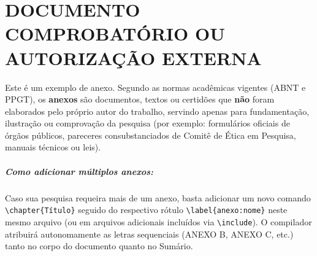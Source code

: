 \anexos

%

\chapter{DOCUMENTO COMPROBATÓRIO OU AUTORIZAÇÃO EXTERNA}
\label{anexo:autorizacao}

Este é um exemplo de anexo. Segundo as normas acadêmicas vigentes (ABNT e PPGT), os \textbf{anexos} são documentos, textos ou certidões que \textbf{não} foram elaborados pelo próprio autor do trabalho, servindo apenas para fundamentação, ilustração ou comprovação da pesquisa (por exemplo: formulários oficiais de órgãos públicos, pareceres consubstanciados de Comitê de Ética em Pesquisa, manuais técnicos ou leis).

\paragraph*{Como adicionar múltiplos anexos:} Caso sua pesquisa requeira mais de um anexo, basta adicionar um novo comando \texttt{\textbackslash chapter\{Título\}} seguido do respectivo rótulo \texttt{\textbackslash label\{anexo:nome\}} neste mesmo arquivo (ou em arquivos adicionais incluídos via \texttt{\textbackslash include}). O compilador atribuirá autonomamente as letras sequenciais (ANEXO B, ANEXO C, etc.) tanto no corpo do documento quanto no Sumário.

%
